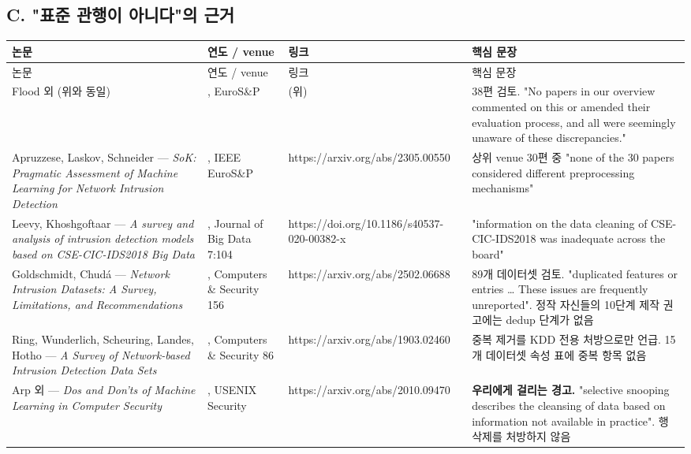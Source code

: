\subsection{C. "표준 관행이 아니다"의 근거}
\begingroup
\footnotesize
\begin{longtable}{>{\raggedright\arraybackslash}p{}>{\raggedright\arraybackslash}p{}>{\raggedright\arraybackslash}p{}>{\raggedright\arraybackslash}p{}}
\toprule
논문 & 연도 /\allowbreak{} venue & 링크 & 핵심 문장 \\ \midrule
\endfirsthead
논문 & 연도 /\allowbreak{} venue & 링크 & 핵심 문장 \\ \midrule
\endhead
{}Flood 외 (위와 동일) & 2024, EuroS\&P & (위) & 38편 검토. "No papers in our overview commented on this or amended their evaluation process, and all were seemingly unaware of these discrepancies." \\
{}Apruzzese, Laskov, Schneider — \emph{SoK: Pragmatic Assessment of Machine Learning for Network Intrusion Detection} & 2023, IEEE EuroS\&P & https:/\allowbreak{}/\allowbreak{}arxiv.org/\allowbreak{}abs/\allowbreak{}2305.00550 & 상위 venue 30편 중 "none of the 30 papers considered different preprocessing mechanisms" \\
{}Leevy, Khoshgoftaar — \emph{A survey and analysis of intrusion detection models based on CSE-CIC-IDS2018 Big Data} & 2020, Journal of Big Data 7:104 & https:/\allowbreak{}/\allowbreak{}doi.org/\allowbreak{}10.1186/\allowbreak{}s40537-020-00382-x & "information on the data cleaning of CSE-CIC-IDS2018 was inadequate across the board" \\
{}Goldschmidt, Chudá — \emph{Network Intrusion Datasets: A Survey, Limitations, and Recommendations} & 2025, Computers \& Security 156 & https:/\allowbreak{}/\allowbreak{}arxiv.org/\allowbreak{}abs/\allowbreak{}2502.06688 & 89개 데이터셋 검토. "duplicated features or entries … These issues are frequently unreported". 정작 자신들의 10단계 제작 권고에는 dedup 단계가 없음 \\
{}Ring, Wunderlich, Scheuring, Landes, Hotho — \emph{A Survey of Network-based Intrusion Detection Data Sets} & 2019, Computers \& Security 86 & https:/\allowbreak{}/\allowbreak{}arxiv.org/\allowbreak{}abs/\allowbreak{}1903.02460 & 중복 제거를 KDD 전용 처방으로만 언급. 15개 데이터셋 속성 표에 중복 항목 없음 \\
{}Arp 외 — \emph{Dos and Don'ts of Machine Learning in Computer Security} & 2022, USENIX Security & https:/\allowbreak{}/\allowbreak{}arxiv.org/\allowbreak{}abs/\allowbreak{}2010.09470 & \textbf{우리에게 걸리는 경고.} "selective snooping describes the cleansing of data based on information not available in practice". 행 삭제를 처방하지 않음 \\
\bottomrule
\end{longtable}
\endgroup
